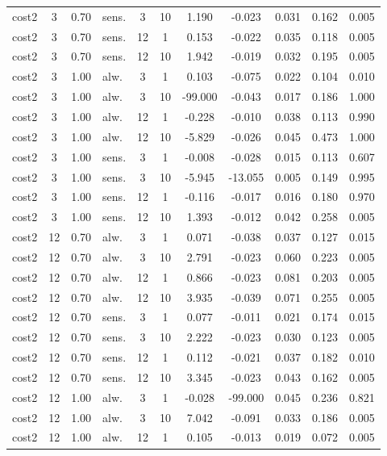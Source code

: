 \begin{scriptsize}
\begin{longtable}{l cclcc ccccc}
cost2 & 3 & 0.70 & sens. & 3 & 10 & 1.190 & -0.023 & 0.031 & 0.162 & 0.005 \\
cost2 & 3 & 0.70 & sens. & 12 & 1 & 0.153 & -0.022 & 0.035 & 0.118 & 0.005 \\
cost2 & 3 & 0.70 & sens. & 12 & 10 & 1.942 & -0.019 & 0.032 & 0.195 & 0.005 \\
cost2 & 3 & 1.00 & alw. & 3 & 1 & 0.103 & -0.075 & 0.022 & 0.104 & 0.010 \\
cost2 & 3 & 1.00 & alw. & 3 & 10 & -99.000 & -0.043 & 0.017 & 0.186 & 1.000 \\
cost2 & 3 & 1.00 & alw. & 12 & 1 & -0.228 & -0.010 & 0.038 & 0.113 & 0.990 \\
cost2 & 3 & 1.00 & alw. & 12 & 10 & -5.829 & -0.026 & 0.045 & 0.473 & 1.000 \\
cost2 & 3 & 1.00 & sens. & 3 & 1 & -0.008 & -0.028 & 0.015 & 0.113 & 0.607 \\
cost2 & 3 & 1.00 & sens. & 3 & 10 & -5.945 & -13.055 & 0.005 & 0.149 & 0.995 \\
cost2 & 3 & 1.00 & sens. & 12 & 1 & -0.116 & -0.017 & 0.016 & 0.180 & 0.970 \\
cost2 & 3 & 1.00 & sens. & 12 & 10 & 1.393 & -0.012 & 0.042 & 0.258 & 0.005 \\
cost2 & 12 & 0.70 & alw. & 3 & 1 & 0.071 & -0.038 & 0.037 & 0.127 & 0.015 \\
cost2 & 12 & 0.70 & alw. & 3 & 10 & 2.791 & -0.023 & 0.060 & 0.223 & 0.005 \\
cost2 & 12 & 0.70 & alw. & 12 & 1 & 0.866 & -0.023 & 0.081 & 0.203 & 0.005 \\
cost2 & 12 & 0.70 & alw. & 12 & 10 & 3.935 & -0.039 & 0.071 & 0.255 & 0.005 \\
cost2 & 12 & 0.70 & sens. & 3 & 1 & 0.077 & -0.011 & 0.021 & 0.174 & 0.015 \\
cost2 & 12 & 0.70 & sens. & 3 & 10 & 2.222 & -0.023 & 0.030 & 0.123 & 0.005 \\
cost2 & 12 & 0.70 & sens. & 12 & 1 & 0.112 & -0.021 & 0.037 & 0.182 & 0.010 \\
cost2 & 12 & 0.70 & sens. & 12 & 10 & 3.345 & -0.023 & 0.043 & 0.162 & 0.005 \\
cost2 & 12 & 1.00 & alw. & 3 & 1 & -0.028 & -99.000 & 0.045 & 0.236 & 0.821 \\
cost2 & 12 & 1.00 & alw. & 3 & 10 & 7.042 & -0.091 & 0.033 & 0.186 & 0.005 \\
cost2 & 12 & 1.00 & alw. & 12 & 1 & 0.105 & -0.013 & 0.019 & 0.072 & 0.005 \\

\end{longtable}
\end{scriptsize}
